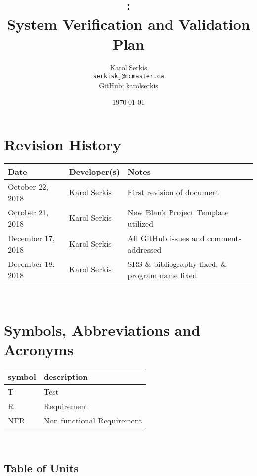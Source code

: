 \documentclass[12pt, titlepage]{article}
\begin{document}
\title{\progname:\\ System Verification and Validation Plan} 
\author{Karol Serkis\\\texttt{serkiskj@mcmaster.ca}\\GitHub:
\href{https://www.github.com/karolserkis}{karolserkis}}
\date{\today}
	
\maketitle


\section{Revision History}

\begin{tabularx}{\textwidth}{p{3.3cm}p{2.5cm}X}
\toprule {\bf Date} & {\bf Developer(s)} & {\bf Notes}\\
\midrule
October 22, 2018 & Karol Serkis & First revision of document\\
October 21, 2018 & Karol Serkis & New Blank Project Template utilized \\
December 17, 2018 & Karol Serkis & All GitHub issues and comments addressed \\
December 18, 2018 & Karol Serkis & SRS \& bibliography fixed, 
\& program name fixed \\
\bottomrule
\end{tabularx}

~\newpage

\section{Symbols, Abbreviations and Acronyms}

\renewcommand{\arraystretch}{1.2}
\begin{tabular}{l l} 
  \toprule		
  \textbf{symbol} & \textbf{description}\\
  \midrule 
  T & Test\\
  R & Requirement\\ 
  NFR & Non-functional Requirement\\ 
  \bottomrule
\end{tabular}\\

\subsection{Table of Units}
\end{document}
